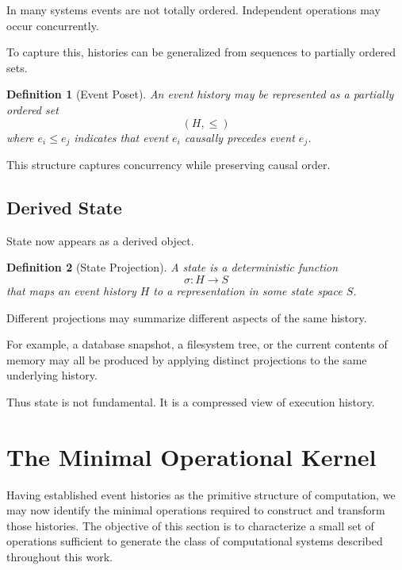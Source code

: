 \documentclass[12pt]{article}
\newtheorem{definition}{Definition}
\begin{document}
In many systems events are not totally ordered.
Independent operations may occur concurrently.

To capture this, histories can be generalized from sequences
to partially ordered sets.

\begin{definition}[Event Poset]
An event history may be represented as a partially ordered set
\[
(H, \leq)
\]
where $e_i \leq e_j$ indicates that event $e_i$
causally precedes event $e_j$.
\end{definition}

This structure captures concurrency while preserving causal order.

\subsection{Derived State}

State now appears as a derived object.

\begin{definition}[State Projection]
A \emph{state} is a deterministic function
\[
\sigma : H \rightarrow S
\]
that maps an event history $H$ to a representation
in some state space $S$.
\end{definition}

Different projections may summarize different aspects
of the same history.

For example, a database snapshot, a filesystem tree,
or the current contents of memory may all be produced
by applying distinct projections to the same underlying history.

Thus state is not fundamental.
It is a compressed view of execution history.


\section{The Minimal Operational Kernel}

Having established event histories as the primitive
structure of computation, we may now identify the
minimal operations required to construct and transform
those histories. The objective of this section is to
characterize a small set of operations sufficient to
generate the class of computational systems described
throughout this work.
\end{document}

